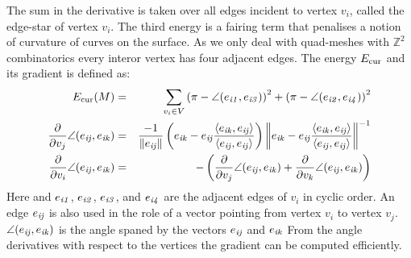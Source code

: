 The sum in the derivative is taken over all edges incident to vertex $v_i$, called the 
edge-star of vertex $v_i$. The third energy is a fairing term that penalises a notion of
curvature of curves on the surface. As we only deal with quad-meshes with $\mathbb Z^2$ combinatorics every interor vertex has four adjacent edges. The energy $E_{\textrm{\scriptsize{cur}}}$ and its gradient is defined as:
\begin{eqnarray*}
	E_{\textrm{\scriptsize{cur}}}(M) &=& \sum_{v_i\in V} \left(\pi - \angle(e_{\mathrm{\it{i1}}}, e_{\mathrm{\it{i3}}}) \right)^2 
	+ \left(\pi - \angle(e_{\mathrm{\it{i2}}}, e_{\mathrm{\it{i4}}}) \right)^2 \\
	\frac{\partial}{\partial v_j}\angle(e_{\mathrm{\it{ij}}},e_{\mathrm{\it{ik}}}) &=& 
	\frac{-1}{\left\Vert e_{\mathrm{\it{ij}}}\right\Vert}\left(e_{\mathrm{\it{ik}}}-e_{\mathrm{\it{ij}}}\frac{\left<e_{\mathrm{\it{ik}}},e_{\mathrm{\it{ij}}}\right>}{\left<e_{\mathrm{\it{ij}}},e_{\mathrm{\it{ij}}}\right>}\right)
	\left\Vert e_{\mathrm{\it{ik}}}-e_{\mathrm{\it{ij}}}\frac{\left<e_{\mathrm{\it{ik}}},e_{\mathrm{\it{ij}}}\right>}		
	{\left<e_{\mathrm{\it{ij}}},e_{\mathrm{\it{ij}}}\right>} \right\Vert^{-1} \\
	\frac{\partial}{\partial v_i}\angle(e_{\mathrm{\it{ij}}},e_{\mathrm{\it{ik}}}) &=& 
	- \left(\frac{\partial}{\partial v_j}\angle(e_{\mathrm{\it{ij}}},e_{\mathrm{\it{ik}}}) + 
	\frac{\partial}{\partial v_k}\angle(e_{\mathrm{\it{ij}}},e_{\mathrm{\it{ik}}})\right)
\end{eqnarray*}
Here and $e_{\mathrm{\it{i1}}}$, $e_{\mathrm{\it{i2}}}$, $e_{\mathrm{\it{i3}}}$, and $e_{\mathrm{\it{i4}}}$ are the adjacent edges of $v_i$ in cyclic order. An edge $e_{\mathrm{\it{ij}}}$ is also used in the role of a vector pointing from vertex $v_i$ to vertex $v_j$. $\angle(e_{\mathrm{\it{ij}}},e_{\mathrm{\it{ik}}})$ is the angle spaned by the vectors $e_{\mathrm{\it{ij}}}$ and $e_{\mathrm{\it{ik}}}$  From the angle derivatives with respect to the vertices the gradient can be computed efficiently.

